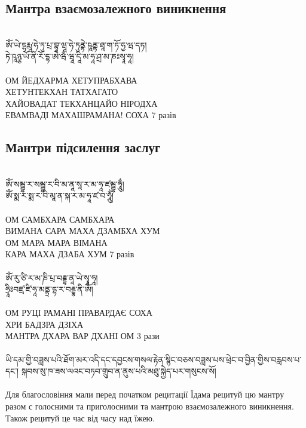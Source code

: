 \subsection*{Мантра взаємозалежного виникнення}
\\
\ti
ཨོཾ་ཡེ་དྷརྨཱ་ཧེ་ཏུ་པྲ་བྷཱ་ཝཱ་ཧེ་ཏུནྟེ་ཥཱནྟ་ཐཱ་ག་ཏོ་ཧྱ་ཝ་དཏ།\\
 ཏེ་ཥཱཉྩ་ཡོ་ནི་རོ་དྷ་ཨེ་ཝྃ་ཝཱ་དཱི་མ་ཧཱ་ཤྲ་མ་ཎཿསྭཱ་ཧཱ།\\
 \\
\ru
ОМ ЙЕДХАРМА ХЕТУПРАБХАВА\\
ХЕТУНТЕКХАН ТАТХАГАТО\\
ХАЙОВАДАТ ТЕКХАНЦАЙО НІРОДХА\\
ЕВАМВАДІ МАХАШРАМАНА! СОХА \hspace{1cm} 7 разів\\

\subsection*{Мантри підсилення заслуг}
\\
\ti
ཨོཾ་སམྦྷ་ར་སམྦྷ་ར་བི་མ་ནཱ་སཱ་ར་མ་ཧཱ་ཛམྦྷ་ཧཱུྂ།\\
ཨོཾ་སྨ་ར་སྨ་ར་བི་མཱ་ན་སྐ་ར་མ་ཧཱ་ཛ་བ་ཧཱུྂ།\\
\\
\ru
ОМ САМБХАРА САМБХАРА\\
ВИМАНА САРА МАХА ДЗАМБХА ХУМ\\
ОМ МАРА МАРА ВІМАНА\\
КАРА МАХА ДЗАБА ХУМ \hspace{1cm} 7 разів\\
\\
\ti
ཨོཾ་རུ་ཙི་ར་མ་ཎི་པྲ་བརྡྷ་ནཱ་ཡེ་སྭཱ་ཧཱ།\\
ཧྲཱིཿབཛྲ་ཛི་ཧཱ་མནྟྲ་དྷ་ར་བརྡྷ་ནི་ཨོཾ།\\
\\
\ru
ОМ РУЦІ РАМАНІ ПРАВАРДАЄ СОХА\\
ХРИ БАДЗРА ДЗІХА\\
МАНТРА ДХАРА ВАР ДХАНІ ОМ \hspace{1cm} 3 рази\\
\\
\scriptsize
\ti ཡི་དམ་གྱི་བཟླས་པའི་ཐོག་མར་འདི་དང་དབྱངས་གསལ་རྟེན་སྙིང་བཅས་བཟླས་པས་ཕྲེང་བ་བྱིན་གྱིས་བརླབས་པ་དང་།
སྐབས་སུ་ཁ་ཟས་ལའང་བཏབ་གྲུབ་ན་ནུས་པའི་མཐུ་སྐྱེད་པར་གསུངས་སོ།\\
\\
\ru Для благословіння мали перед початком рецитації Їдама
рецитуй цю мантру разом с голосними та приголосними
та мантрою взаємозалежного виникнення.
Також рецитуй це час від часу над їжею.
\normalsize
